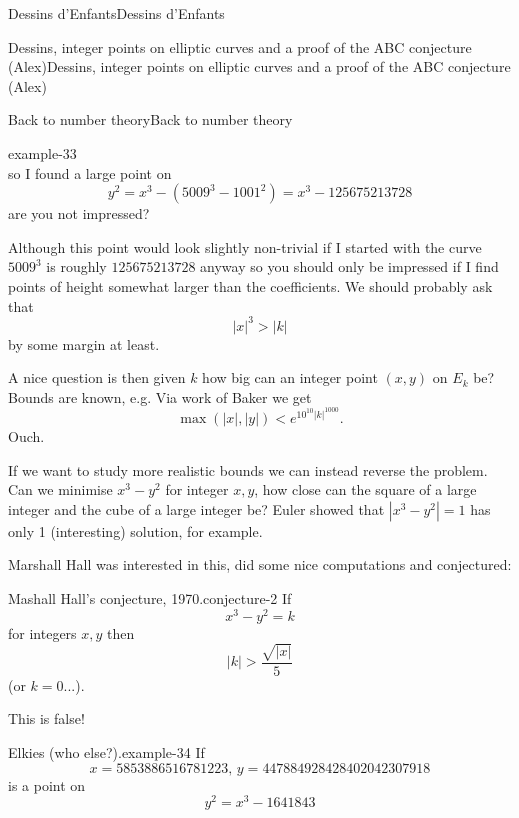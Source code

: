 \documentclass[10pt,]{book}
\numberwithin{equation}{section}
\newcommand{\lt}{<}
\newcommand{\gt}{>}
\begin{document}
\begin{chapterptx}{Dessins d'Enfants}{}{Dessins d'Enfants}{}{}
\begin{sectionptx}{Dessins, integer points on elliptic curves and a proof of the ABC conjecture (Alex)}{}{Dessins, integer points on elliptic curves and a proof of the ABC conjecture (Alex)}{}{}
\begin{subsectionptx}{Back to number theory}{}{Back to number theory}{}{}
\begin{example}{}{example-33}
\begin{equation*}
\end{equation*}
so I found a large point on%
\begin{equation*}
y^2 = x^3 - (5009^3 - 1001^2) = x^3 - 125675213728
\end{equation*}
are you not impressed?%
\end{example}
\hypertarget{p-708}{}%
Although this point would look slightly non-trivial if I started with the curve \(5009^3\) is roughly \(125675213728\) anyway so you should only be impressed if I find points of height somewhat larger than the coefficients. We should probably ask that%
\begin{equation*}
|x|^3 \gt |k|
\end{equation*}
by some margin at least.%
\par
\hypertarget{p-709}{}%
A nice question is then given \(k\) how big can an integer point \((x,y)\) on \(E_k\) be? Bounds are known, e.g.  Via work of Baker we get%
\begin{equation*}
\max(|x|, |y|) \lt e^{10^{10}|k|^{1000}}\text{.}
\end{equation*}
Ouch.%
\par
\hypertarget{p-710}{}%
If we want to study more realistic bounds we can instead reverse the problem. Can we minimise \(x^3 - y^2\) for integer \(x,y\), how close can the square of a large integer and the cube of a large integer be? Euler showed that \(|x^3 - y^2| = 1\) has only 1 (interesting) solution, for example.%
\par
\hypertarget{p-711}{}%
Marshall Hall was interested in this, did some nice computations and conjectured:%
\begin{conjecture}{Mashall Hall's conjecture, 1970.}{}{conjecture-2}%
\hypertarget{p-712}{}%
If%
\begin{equation*}
x^3 - y^2 = k
\end{equation*}
for integers \(x,y\) then%
\begin{equation*}
|k| \gt \frac{\sqrt{|x|}}{5}
\end{equation*}
(or \(k =0\)...).%
\end{conjecture}
\hypertarget{p-713}{}%
This is false!%
\begin{example}{Elkies (who else?).}{example-34}%
\hypertarget{p-714}{}%
If%
\begin{equation*}
x= 5853886516781223,\,y = 447884928428402042307918
\end{equation*}
is a point on%
\begin{equation*}
y^2 = x^3 - 1641843
\end{equation*}

\end{example}
\end{subsectionptx}
\end{sectionptx}
\end{chapterptx}
\end{document}
